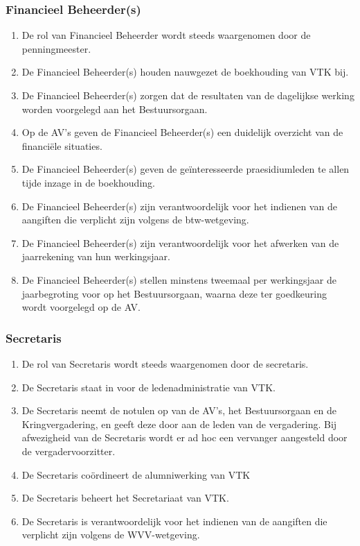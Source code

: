    \subsubsection{Financieel Beheerder(s)}
    \begin{enumerate}
    \item De rol van Financieel Beheerder wordt steeds waargenomen door de penningmeester.
    \item De Financieel Beheerder(s) houden nauwgezet de boekhouding van VTK bij.
    \item De Financieel Beheerder(s) zorgen dat de resultaten van de dagelijkse werking worden voorgelegd aan het Bestuursorgaan.
    \item Op de AV's geven de Financieel Beheerder(s) een duidelijk overzicht van de financi\"ele situaties.
    \item De Financieel Beheerder(s) geven de ge\"interesseerde praesidiumleden te allen tijde inzage in de boekhouding.
    \item De Financieel Beheerder(s) zijn verantwoordelijk voor het indienen van de aangiften die verplicht zijn volgens de btw-wetgeving.
    \item De Financieel Beheerder(s) zijn verantwoordelijk voor het afwerken van de jaarrekening van hun werkingsjaar.
    \item De Financieel Beheerder(s) stellen minstens tweemaal per werkingsjaar de jaarbegroting voor op het Bestuursorgaan, waarna deze ter goedkeuring wordt voorgelegd op de AV.
    \end{enumerate}
    
    \subsubsection{Secretaris}
    \begin{enumerate}
    \item De rol van Secretaris wordt steeds waargenomen door de secretaris.
    \item De Secretaris staat in voor de ledenadministratie van VTK.
    \item De Secretaris neemt de notulen op van de AV's, het Bestuursorgaan en de Kringvergadering, en geeft deze door aan de leden van de vergadering. Bij afwezigheid van de Secretaris wordt er ad hoc een vervanger aangesteld door de vergadervoorzitter.
    \item De Secretaris co\"ordineert de alumniwerking van VTK %
    \item De Secretaris beheert het Secretariaat van VTK.
    \item De Secretaris is verantwoordelijk voor het indienen van de aangiften die verplicht zijn volgens de WVV-wetgeving.
    \end{enumerate}

